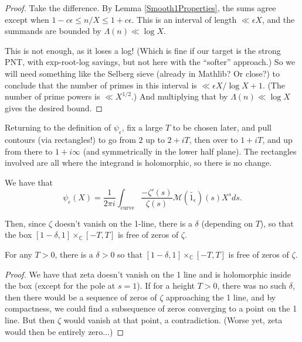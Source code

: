 \begin{proof}
Take the difference. By Lemma \ref{Smooth1Properties}, the sums agree except when $1-c \epsilon \leq n/X \leq 1+c \epsilon$. This is an interval of length $\ll \epsilon X$, and the summands are bounded by $\Lambda(n) \ll \log X$.

This is not enough, as it loses a log! (Which is fine if our target is the strong PNT, with exp-root-log savings, but not here with the ``softer'' approach.) So we will need something like the Selberg sieve (already in Mathlib? Or close?) to conclude that the number of primes in this interval is $\ll \epsilon X / \log X + 1$.
(The number of prime powers is $\ll X^{1/2}$.)
And multiplying that by $\Lambda (n) \ll \log X$ gives the desired bound.
\end{proof}



Returning to the definition of $\psi_{\epsilon}$, fix a large $T$ to be chosen later, and pull contours (via rectangles!) to go
from $2$ up to $2+iT$, then over to $1+iT$, and up from there to $1+i\infty$ (and symmetrically in the lower half plane).  The
rectangles involved are all where the integrand is holomorphic, so there is no change.
\begin{theorem}\label{SmoothedChebyshevPull1}
We have that
$$\psi_{\epsilon}(X) = \frac{1}{2\pi i}\int_{\text{curve}}\frac{-\zeta'(s)}{\zeta(s)}
\mathcal{M}(\widetilde{1_{\epsilon}})(s)
X^{s}ds.$$
\end{theorem}



Then, since $\zeta$ doesn't vanish on the 1-line, there is a $\delta$ (depending on $T$), so that the box $[1-\delta,1] \times_{ℂ} [-T,T]$ is free of zeros of $\zeta$.
\begin{theorem}\label{ZetaNoZerosInBox}
For any $T>0$, there is a $\delta>0$ so that $[1-\delta,1] \times_{ℂ} [-T,T]$ is free of zeros of $\zeta$.
\end{theorem}



\begin{proof}
We have that zeta doesn't vanish on the 1 line and is holomorphic inside the box (except for the pole at $s=1$). If for a height $T>0$, there was no such $\delta$, then there would be a sequence of zeros of $\zeta$ approaching the 1 line, and by compactness, we could find a subsequence of zeros converging to a point on the 1 line. But then $\zeta$ would vanish at that point, a contradiction. (Worse yet, zeta would then be entirely zero...)
\end{proof}



